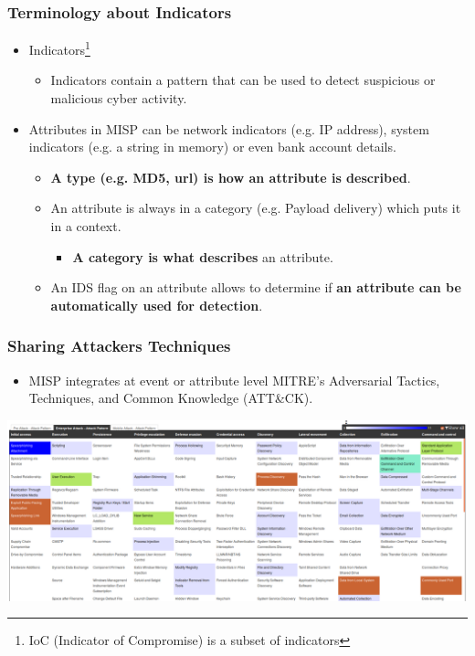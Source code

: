 \begin{frame}
        \frametitle{Terminology about Indicators}
        \begin{itemize}
                \item Indicators\footnote{IoC (Indicator of Compromise) is a subset of indicators}
                        \begin{itemize}
                                \item Indicators contain a pattern that can be used to detect suspicious or malicious cyber activity.
                        \end{itemize}
                \item Attributes in MISP can be network indicators (e.g. IP address), system indicators (e.g. a string in memory) or even bank account details.
                \begin{itemize}
                        \item {\bf A type (e.g. MD5, url) is how an attribute is described}.
                \end{itemize}
                \begin{itemize}
                \item An attribute is always in a category (e.g. Payload delivery) which puts it in a context.
                        \begin{itemize}
                                \item {\bf A category is what describes} an attribute.
                        \end{itemize}
                \item An IDS flag on an attribute allows to determine if {\bf an attribute can be automatically used for detection}.
                \end{itemize}
        \end{itemize}
\end{frame}


\begin{frame}
        \frametitle{Sharing Attackers Techniques}
        \begin{itemize}
                \item MISP integrates at event or attribute level MITRE's Adversarial Tactics, Techniques, and Common Knowledge (ATT\&CK).
        \end{itemize}
        \includegraphics[scale=0.2]{screenshots/attack-screenshot.png}
\end{frame}

